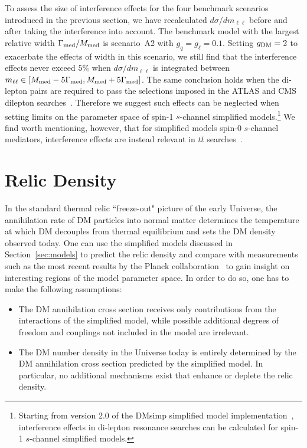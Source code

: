 \documentclass[a4paper, 11pt,notoc]{article}
\begin{document}
To assess the size of interference effects for the four benchmark scenarios introduced in the previous section, we have recalculated  $d \sigma/d m_{\ell \ell}$ before and after taking the interference into account. The benchmark model with the largest relative width $\Gamma_{\rm med}/M_{\rm med}$ is 
scenario~A2 with $g_q=g_\ell =0.1$. Setting $g_{\rm DM} = 2$ to exacerbate the effects of width in this scenario, we still find that the interference effects never exceed $5\%$ when $d \sigma/d m_{\ell \ell}$ is integrated between $m_{\ell \ell} \in [M_{\rm med}-5 \Gamma_{\rm med}, M_{\rm med}+5 \Gamma_{\rm med}]$. The same conclusion holds when the di-lepton pairs are required to pass the selections imposed in the ATLAS and CMS dilepton searches~\cite{Aaboud:2016cth,Khachatryan:2016zqb}. Therefore we suggest such effects can be neglected when setting limits on the parameter space of spin-1 $s$-channel simplified models.\footnote{Starting from version 2.0 of the {\sc DMsimp} simplified model implementation~\cite{DMsimp}, interference effects in di-lepton resonance searches can be calculated for spin-1 $s$-channel simplified models.} We find worth mentioning, however, that for simplified models 
spin-0 $s$-channel mediators, interference effects are instead relevant in $t\bar{t}$ searches~\cite{Dicus:1994bm,Frederix:2007gi,Djouadi:2015jea,Craig:2015jba,Jung:2015gta,Bernreuther:2015fts,Gori:2016zto,Carena:2016npr,Aaboud:2017hnm,Bauer:2017ota}.

\section{Relic Density}
\label{sec:relic}

In the standard thermal relic ``freeze-out" picture of the early Universe,
the annihilation rate of DM particles into normal matter determines the temperature at which DM decouples from thermal equilibrium and sets the DM density observed today.
One can use the simplified models discussed in Section~\ref{sec:models} to predict the relic density and compare with measurements such as the most recent results by the Planck collaboration~\cite{Ade:2015xua} to gain insight on interesting regions of the model parameter space. In order to do so, one has to make the following assumptions:
\begin{itemize}
\item The DM annihilation cross section receives only contributions from the interactions of the simplified model, while possible additional degrees of freedom and couplings not included in the model are irrelevant. 
\item The DM number density in the Universe today is entirely determined by  the DM annihilation cross section predicted by the simplified model. In particular, no additional mechanisms exist that enhance or deplete the relic density.
\end{itemize}
\end{document}

